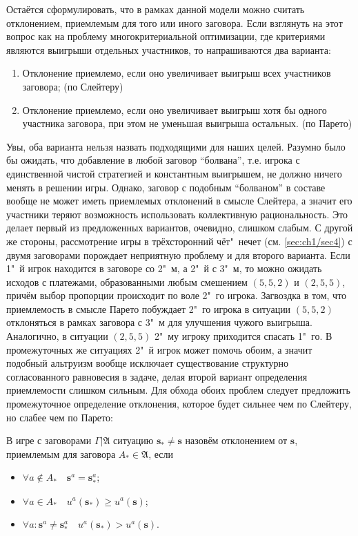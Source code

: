 Остаётся сформулировать, что в рамках данной модели можно считать отклонением, приемлемым для того или иного заговора. Если взглянуть на этот вопрос как на проблему многокритериальной оптимизации, где критериями являются выигрыши отдельных участников, то напрашиваются два варианта:
\begin{enumerate}
	\item Отклонение приемлемо, если оно увеличивает выигрыш всех участников заговора; (по Слейтеру)
	\item Отклонение приемлемо, если оно увеличивает выигрыш хотя бы одного участника заговора, при этом не уменьшая выигрыша остальных. (по Парето)
\end{enumerate}

Увы, оба варианта нельзя назвать подходящими для наших целей. Разумно было бы ожидать, что добавление в любой заговор "`болвана"', т.е. игрока с единственной чистой стратегией и константным выигрышем, не должно ничего менять в решении игры. Однако, заговор с подобным "`болваном"' в составе вообще не может иметь приемлемых отклонений в смысле Слейтера, а значит его участники теряют возможность использовать коллективную рациональность. Это делает первый из предложенных вариантов, очевидно, слишком слабым. С другой же стороны, рассмотрение игры в трёхсторонний чёт"~нечет (см. \ref{sec:ch1/sec4}) с двумя заговорами порождает неприятную проблему и для второго варианта. Если 1"~й игрок находится в заговоре со 2"~м, а 2"~й с 3"~м, то можно ожидать исходов с платежами, образованными любым смешением $(5,5,2)$ и $(2,5,5)$, причём выбор пропорции происходит по воле 2"~го игрока. Загвоздка в том, что приемлемость в смысле Парето побуждает 2"~го игрока в ситуации $(5,5,2)$ отклоняться в рамках заговора с 3"~м для улучшения чужого выигрыша. Аналогично, в ситуации $(2,5,5)$ 2"~му игроку приходится спасать 1"~го. В промежуточных же ситуациях 2"~й игрок может помочь обоим, а значит подобный альтруизм вообще исключает существование структурно согласованного равновесия в задаче, делая второй вариант определения приемлемости слишком сильным. Для обхода обоих проблем следует предложить промежуточное определение отклонения, которое будет сильнее чем по Слейтеру, но слабее чем по Парето:
\begin{definition}
	В игре с заговорами $\Gamma | \mathfrak{A}$ ситуацию $\mathbf{s}_* \neq \mathbf{s}$ назовём отклонением от $\mathbf{s}$, приемлемым для заговора $A_* \in \mathfrak{A}$, если
	\begin{itemize}
		\item $\forall a \notin A_* \quad \mathbf{s}^a = \mathbf{s}_*^a$;
		\item $\forall a \in A_* \quad u^a(\mathbf{s}_*) \geq u^a(\mathbf{s})$;
		\item $\forall a : \mathbf{s}^a \neq \mathbf{s}_*^a \quad u^a(\mathbf{s}_*) > u^a(\mathbf{s})$.
	\end{itemize}
\end{definition}

